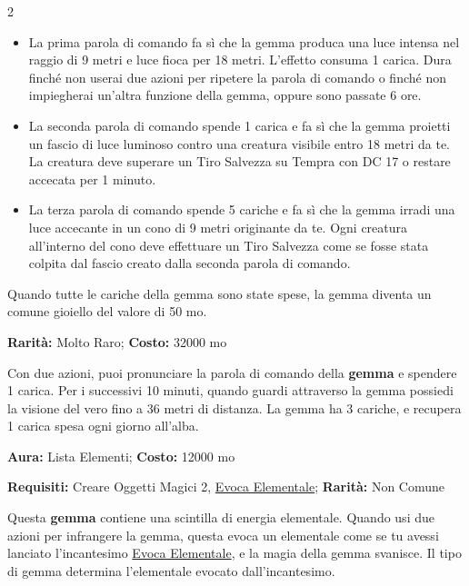 \begin{multicols}{2}
\begin{itemize}[leftmargin=*] \setlength{\itemsep}{0pt}
\item
La prima parola di comando fa sì che la gemma produca una luce intensa nel raggio di 9 metri e luce fioca per 18 metri. L'effetto consuma 1 carica. Dura finché non userai due azioni per ripetere la parola di comando o finché non impiegherai un'altra funzione della gemma, oppure sono passate 6 ore.

\item
La seconda parola di comando spende 1 carica e fa sì che la gemma proietti un fascio di luce luminoso contro una creatura visibile entro 18 metri da te. La creatura deve superare un Tiro Salvezza su Tempra con DC 17 o restare accecata per 1 minuto.

\item
La terza parola di comando spende 5 cariche e fa sì che la gemma irradi una luce accecante in un cono di 9 metri originante da te. Ogni creatura all'interno del cono deve effettuare un Tiro Salvezza come se fosse stata colpita dal fascio creato dalla seconda parola di comando.

\end{itemize}

\medskip

Quando tutte le cariche della gemma sono state spese, la gemma diventa un comune gioiello del valore di 50 mo.


\textbf{Rarità:} Molto Raro; \textbf{Costo:} 32000 mo

Con due azioni, puoi pronunciare la parola di comando della \textbf{gemma} e spendere 1 carica. Per i successivi 10 minuti, quando guardi attraverso la gemma possiedi la visione del vero fino a 36 metri di distanza. La gemma ha 3 cariche, e recupera 1 carica spesa ogni giorno all'alba.


\textbf{Aura:} Lista Elementi; \textbf{Costo:} 12000 mo

\textbf{Requisiti:} Creare Oggetti Magici 2, \hyperlink{Evoca Elementale}{Evoca Elementale}; \textbf{Rarità:} Non Comune

Questa \textbf{gemma} contiene una scintilla di energia elementale. Quando usi due azioni per infrangere la gemma, questa evoca un elementale come se tu avessi lanciato l'incantesimo \hyperlink{Evoca Elementale}{Evoca Elementale}, e la magia della gemma svanisce. Il tipo di gemma determina l'elementale evocato dall'incantesimo.


\end{multicols}
